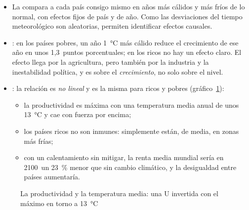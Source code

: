 \documentclass[11pt]{article}
\begin{document}
\begin{itemize}
\item La  compara a cada país consigo mismo en años más cálidos y más fríos de lo normal, con efectos fijos de país y de año. Como las desviaciones del tiempo meteorológico son aleatorias, permiten identificar efectos causales\nocite{DellJonesOlken2014Weather,Hsiang2016Climate}.
\item \textcite{DellJonesOlken2012Temperature}: en los países pobres, un año 1~°C más cálido reduce el crecimiento de ese año en unos 1,3~puntos porcentuales; en los ricos no hay un efecto claro. El efecto llega por la agricultura, pero también por la industria y la inestabilidad política, y es sobre el \emph{crecimiento}, no solo sobre el nivel.
\item \textcite{BurkeHsiangMiguel2015Global}: la relación es \emph{no lineal} y es la misma para ricos y pobres (gráfico~\ref{fig:temperatura-productividad}):
  \begin{itemize}
  \item la productividad es máxima con una temperatura media anual de unos 13~°C y cae con fuerza por encima;
  \item los países ricos no son inmunes: simplemente están, de media, en zonas más frías;
  \item con un calentamiento sin mitigar, la renta media mundial sería en 2100~un 23~\% menor que sin cambio climático, y la desigualdad entre países aumentaría.
  \end{itemize}
\end{itemize}

\begin{figure}[H]
\centering
\caption{La productividad y la temperatura media: una U invertida con el máximo en torno a 13~°C}\label{fig:temperatura-productividad}
\end{figure}
\end{document}
